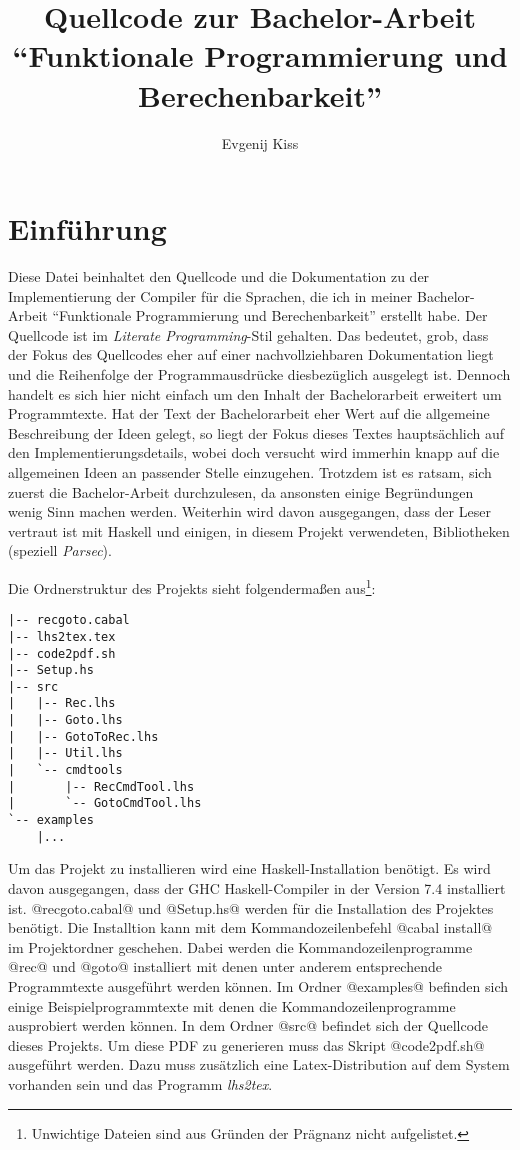 \documentclass[
    a4paper,
    oneside,
    parskip=half,
    toc=listof,
    bibliography=totoc,
    listof=totoc,
]{scrbook}
\title{Quellcode zur Bachelor-Arbeit
``Funktionale Programmierung und Berechenbarkeit''}
\author{Evgenij Kiss}
\newenvironment{myindent}[1]%
 {\begin{list}{}%
         {\setlength{\leftmargin}{#1}}%
         \item[]%
 }
 {\end{list}}
\begin{document}
\maketitle
\tableofcontents

\chapter{Einführung}

Diese Datei beinhaltet den Quellcode und die Dokumentation zu der
Implementierung der Compiler für die Sprachen, die ich in meiner Bachelor-Arbeit
``Funktionale Programmierung und Berechenbarkeit'' erstellt habe. Der Quellcode
ist im \emph{Literate Programming}-Stil gehalten. Das bedeutet, grob, dass der
Fokus des Quellcodes eher auf einer nachvollziehbaren Dokumentation liegt und
die Reihenfolge der Programmausdrücke diesbezüglich ausgelegt ist. Dennoch
handelt es sich hier nicht einfach um den Inhalt der Bachelorarbeit erweitert um
Programmtexte. Hat der Text der Bachelorarbeit eher Wert auf die allgemeine
Beschreibung der Ideen gelegt, so liegt der Fokus dieses Textes hauptsächlich
auf den Implementierungsdetails, wobei doch versucht wird immerhin knapp auf die
allgemeinen Ideen an passender Stelle einzugehen. Trotzdem ist es ratsam, sich
zuerst die Bachelor-Arbeit durchzulesen, da ansonsten einige Begründungen wenig
Sinn machen werden. Weiterhin wird davon ausgegangen, dass der Leser vertraut
ist mit Haskell und einigen, in diesem Projekt verwendeten, Bibliotheken
(speziell \emph{Parsec}).

Die Ordnerstruktur des Projekts sieht folgendermaßen aus\footnote{Unwichtige
Dateien sind aus Gründen der Prägnanz nicht aufgelistet.}:
%
\begin{myindent}{3mm}
\begin{verbatim}
|-- recgoto.cabal
|-- lhs2tex.tex
|-- code2pdf.sh
|-- Setup.hs
|-- src
|   |-- Rec.lhs
|   |-- Goto.lhs
|   |-- GotoToRec.lhs
|   |-- Util.lhs
|   `-- cmdtools
|       |-- RecCmdTool.lhs
|       `-- GotoCmdTool.lhs
`-- examples
    |...
\end{verbatim}
\end{myindent}
%
Um das Projekt zu installieren wird eine Haskell-Installation benötigt. Es wird
davon ausgegangen, dass der GHC Haskell-Compiler in der Version 7.4 installiert
ist. @recgoto.cabal@ und @Setup.hs@ werden für die Installation des Projektes
benötigt. Die Installtion kann mit dem Kommandozeilenbefehl @cabal install@ im
Projektordner geschehen. Dabei werden die Kommandozeilenprogramme @rec@ und
@goto@ installiert mit denen unter anderem entsprechende Programmtexte
ausgeführt werden können. Im Ordner @examples@ befinden sich einige
Beispielprogrammtexte mit denen die Kommandozeilenprogramme ausprobiert werden
können. In dem Ordner @src@ befindet sich der Quellcode dieses Projekts. Um
diese PDF zu generieren muss das Skript @code2pdf.sh@ ausgeführt werden. Dazu
muss zusätzlich eine Latex-Distribution auf dem System vorhanden sein und das
Programm \emph{lhs2tex}.
\end{document}
